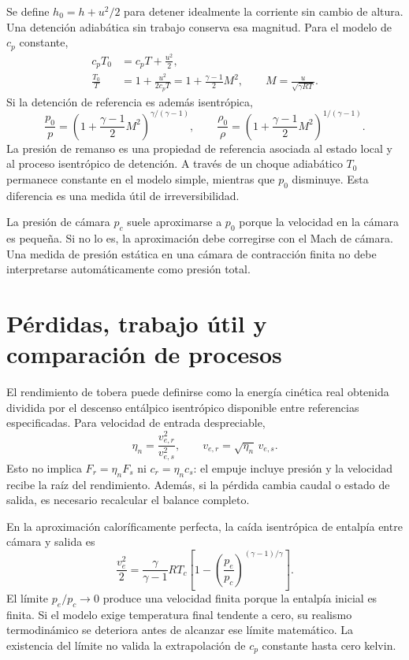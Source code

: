Se define $h_0=h+u^2/2$ para detener idealmente la corriente sin cambio de altura. Una detención adiabática sin trabajo conserva esa magnitud. Para el modelo de $c_p$ constante,
\begin{align}
 c_pT_0&=c_pT+\frac{u^2}{2},\\
 \frac{T_0}{T}&=1+\frac{u^2}{2c_pT}
 =1+\frac{\gamma-1}{2}M^2,\qquad M=\frac{u}{\sqrt{\gamma RT}}.
\end{align}
Si la detención de referencia es además isentrópica,
\begin{equation}\label{eq:stagnation}
 \frac{p_0}{p}=\left(1+\frac{\gamma-1}{2}M^2\right)^{\gamma/(\gamma-1)},\qquad
 \frac{\rho_0}{\rho}=\left(1+\frac{\gamma-1}{2}M^2\right)^{1/(\gamma-1)}.
\end{equation}
La presión de remanso es una propiedad de referencia asociada al estado local y al proceso isentrópico de detención. A través de un choque adiabático $T_0$ permanece constante en el modelo simple, mientras que $p_0$ disminuye. Esta diferencia es una medida útil de irreversibilidad.

La presión de cámara $p_c$ suele aproximarse a $p_0$ porque la velocidad en la cámara es pequeña. Si no lo es, la aproximación debe corregirse con el Mach de cámara. Una medida de presión estática en una cámara de contracción finita no debe interpretarse automáticamente como presión total.
\section{Pérdidas, trabajo útil y comparación de procesos}
El rendimiento de tobera puede definirse como la energía cinética real obtenida dividida por el descenso entálpico isentrópico disponible entre referencias especificadas. Para velocidad de entrada despreciable,
\[\eta_n=\frac{v_{e,r}^2}{v_{e,s}^2},\qquad v_{e,r}=\sqrt{\eta_n}\,v_{e,s}.\]
Esto no implica $F_r=\eta_n F_s$ ni $c_r=\eta_n c_s$: el empuje incluye presión y la velocidad recibe la raíz del rendimiento. Además, si la pérdida cambia caudal o estado de salida, es necesario recalcular el balance completo.

En la aproximación caloríficamente perfecta, la caída isentrópica de entalpía entre cámara y salida es
\begin{equation}
 \frac{v_e^2}{2}=\frac{\gamma}{\gamma-1}RT_c
 \left[1-\left(\frac{p_e}{p_c}\right)^{(\gamma-1)/\gamma}\right].
\end{equation}
El límite $p_e/p_c\to0$ produce una velocidad finita porque la entalpía inicial es finita. Si el modelo exige temperatura final tendente a cero, su realismo termodinámico se deteriora antes de alcanzar ese límite matemático. La existencia del límite no valida la extrapolación de $c_p$ constante hasta cero kelvin.\cite{MIT03,MIT12,CEA-RP1}
